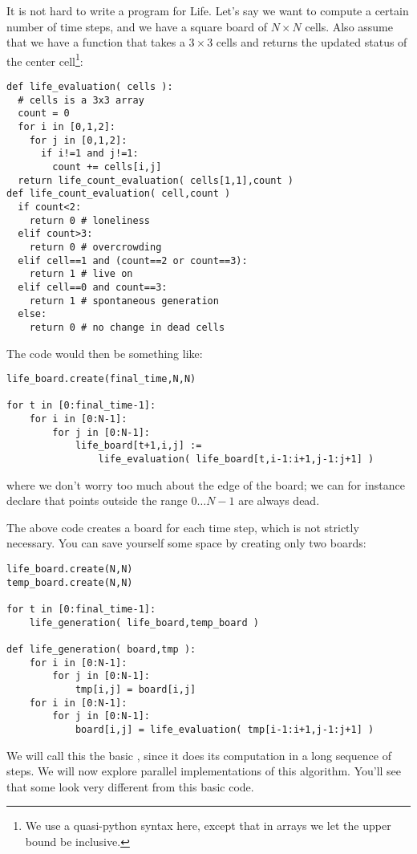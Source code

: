 It is not hard to write a program for Life. Let's say we want to compute a certain
number of time steps, and we have a square board of $N\times N$ cells.
Also assume that we have a function  that takes a
$3\times3$ cells and returns the updated status of the center cell\footnote{We
use a quasi-python syntax here, except that in arrays we let the upper bound 
be inclusive.}:
\begin{verbatim}
def life_evaluation( cells ):
  # cells is a 3x3 array
  count = 0
  for i in [0,1,2]:
    for j in [0,1,2]:
      if i!=1 and j!=1:
        count += cells[i,j]
  return life_count_evaluation( cells[1,1],count )
def life_count_evaluation( cell,count )
  if count<2:
    return 0 # loneliness
  elif count>3:
    return 0 # overcrowding
  elif cell==1 and (count==2 or count==3):
    return 1 # live on
  elif cell==0 and count==3:
    return 1 # spontaneous generation
  else:
    return 0 # no change in dead cells
\end{verbatim}

The code would then be something like:
\begin{verbatim}
life_board.create(final_time,N,N)

for t in [0:final_time-1]:
    for i in [0:N-1]:
        for j in [0:N-1]:
            life_board[t+1,i,j] := 
                life_evaluation( life_board[t,i-1:i+1,j-1:j+1] )
\end{verbatim}
where we don't worry too much about the edge of the board;
we can for instance declare that points outside the range $0\ldots N-1$ 
are always dead.

The above code creates a board for each time step, which
is not strictly necessary. You can save yourself some space
by creating only two boards:
\begin{verbatim}
life_board.create(N,N)
temp_board.create(N,N)

for t in [0:final_time-1]:
    life_generation( life_board,temp_board )

def life_generation( board,tmp ):
    for i in [0:N-1]:
        for j in [0:N-1]:
            tmp[i,j] = board[i,j]
    for i in [0:N-1]:
        for j in [0:N-1]:
            board[i,j] = life_evaluation( tmp[i-1:i+1,j-1:j+1] )
\end{verbatim}
We will call this the basic , since it does
its computation in a long sequence of steps. We will now explore parallel
implementations of this algorithm. You'll see that some look very different 
from this basic code.

